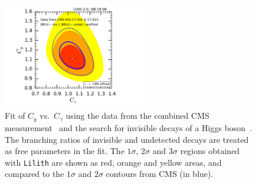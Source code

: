 \begin{figure}[t!]\centering
\includegraphics[width=0.55\textwidth]{validation/CMS/HIG-17-031-CgCGa_BRinvBRund_profiled.pdf}%
\vspace*{-2mm}
\caption{Fit of $C_g$ vs.\ $C_\gamma$ using the data from the combined CMS measurement~\cite{Sirunyan:2018koj} and the 
search for invisible decays of a Higgs boson~\cite{Sirunyan:2018owy}. The branching ratios of invisible and undetected decays 
are treated as free parameters in the fit. 
The  $1\sigma$,  $2\sigma$ and $3\sigma$ regions obtained with {\tt Lilith} are shown as red, orange and yellow areas, 
and compared to the $1\sigma$ and $2\sigma$ contours from CMS (in blue).}
\label{fig:validation_cms_inv}
\end{figure}


